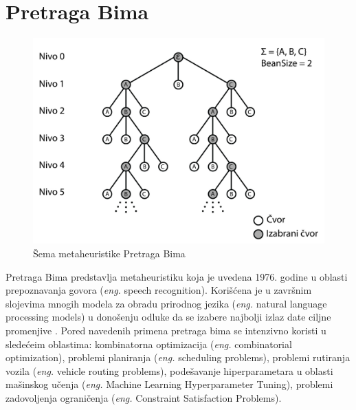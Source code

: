 \documentclass[12pt,oneside]{memoir}
\begin{document}
\section{Pretraga Bima}
\label{sec:pretragaBima}
\begin{figure}[!ht]
  \centering
  \includegraphics[width=1\textwidth]{Slike/bs2.png}
  \caption{Šema metaheuristike Pretraga Bima} 
  \label{fig:pretragaBima}
\end{figure}
Pretraga Bima predstavlja metaheuristiku koja je uvedena 1976. godine u oblasti prepoznavanja govora
(\textit{eng.} speech recognition). Korišćena je u završnim slojevima mnogih modela za
obradu prirodnog jezika (\textit{eng.} natural language processing models) u donošenju odluke da se izabere najbolji
izlaz date ciljne promenjive \cite{BSIntroduction}. Pored navedenih primena pretraga bima se intenzivno koristi u sledećeim
oblastima: kombinatorna optimizacija (\textit{eng.} combinatorial optimization), problemi planiranja (\textit{eng.} scheduling problems),
problemi rutiranja vozila (\textit{eng.} vehicle routing problems), podešavanje hiperparametara u oblasti mašinskog učenja
(\textit{eng.} Machine Learning Hyperparameter Tuning), problemi zadovoljenja ograničenja (\textit{eng.} Constraint Satisfaction Problems). 
\end{document}
